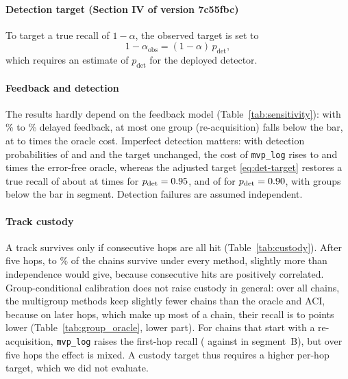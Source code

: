 \paragraph*{Detection target (Section IV of version 7c55fbc)}
To target a true recall of $1-\alpha$, the observed
target is set to
\begin{equation}
  1-\alpha_{\mathrm{obs}} = (1-\alpha)\,p_{\mathrm{det}},
  \label{eq:det-target}
\end{equation}
which requires an estimate of $p_{\mathrm{det}}$ for the deployed detector.

\paragraph*{Feedback and detection}
The results hardly depend on the feedback model
(Table~\ref{tab:sensitivity}): with \sensFeedbackMinPct\% to
\sensFeedbackMaxPct\% delayed feedback, at most one group (re-acquisition) falls
below the bar, at \sensFbCostRatioMin{} to \sensFbCostRatioMax{} times the oracle
cost. Imperfect detection matters: with detection probabilities of \sensDetHigh{}
and \sensDetLow{} and the target unchanged, the cost of \texttt{mvp\_log} rises to
\sensDetNinetyFiveUnadjCostRatio{} and \sensDetNinetyUnadjCostRatio{} times the
error-free oracle, whereas the adjusted target \eqref{eq:det-target} restores a
true recall of about \sensDetNinetyFiveAdjRecallA{} at
\sensDetNinetyFiveAdjCostRatio{} times for $p_{\mathrm{det}}=0.95$, and of
\sensDetNinetyAdjRecallA{} for $p_{\mathrm{det}}=0.90$, with \sensDetNinetyAdjBelowBarMaxWord{} groups
below the bar in \sensDetNinetyAdjSegmentsBelowWord{} segment. Detection failures are assumed
independent.

\paragraph*{Track custody}
A track survives only if consecutive hops are all hit (Table~\ref{tab:custody}).
After five hops, \custFiveMinPct{} to \custFiveMaxPct\% of the chains survive under
every method, slightly more than independence would give, because consecutive hits
are positively correlated. Group-conditional calibration does not raise custody in
general: over all chains, the multigroup methods keep slightly fewer chains than
the oracle and ACI, because on later hops, which make up most of a chain, their
recall is \custLaterRecallGapMin{} to \custLaterRecallGapMax{} points lower
(Table~\ref{tab:group_oracle}, lower part). For chains that start with a
re-acquisition,
\texttt{mvp\_log} raises the first-hop recall (\custReacqMvpLogBKOne{} against
\custReacqOracleBKOne{} in segment~B), but over five hops the effect is mixed. A
custody target thus requires a higher per-hop target, which we did not evaluate.

